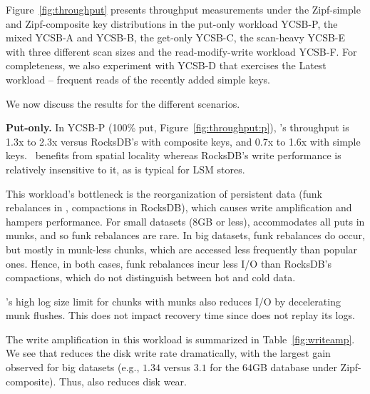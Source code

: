 Figure~\ref{fig:throughput} presents throughput measurements under the Zipf-simple and 
Zipf-composite key distributions in the put-only workload YCSB-P, the mixed YCSB-A and YCSB-B, 
the get-only YCSB-C, the scan-heavy YCSB-E with three different scan sizes
and the read-modify-write workload YCSB-F.
For completeness, we also experiment with YCSB-D that exercises the 
Latest workload -- frequent reads of the recently added simple keys. 

We now discuss the results for the different scenarios.

  
{\bf Put-only.} 
In {YCSB-P} (100\% put, Figure~\ref{fig:throughput:p}), 
\sys's throughput is 1.3x to 2.3x versus RocksDB's with composite keys, 
and 0.7x to 1.6x with simple keys. 
\sys\ benefits from spatial locality whereas RocksDB's write performance 
is relatively insensitive to it, as is typical for LSM stores.

This workload's bottleneck is the reorganization of persistent data  
(funk rebalances in \sys, compactions in RocksDB), which causes 
write amplification and hampers performance. 
For small datasets (8GB or less), \sys\/ accommodates all puts in munks, and so
funk rebalances are rare. In big datasets, funk rebalances do occur, but mostly in munk-less 
chunks, which are accessed less frequently than popular ones. 
Hence, in both cases, funk rebalances incur less I/O than RocksDB's compactions, which do not 
distinguish between hot and cold data. 

\sys\/'s high log size limit for chunks with munks 
also reduces I/O by decelerating munk flushes. This does not impact recovery time since \sys\/ 
does not replay its logs.

The write amplification in this workload is summarized in 
Table~\ref{fig:writeamp}. We see that \sys\/ reduces the disk write rate dramatically, 
with the largest gain observed for big datasets (e.g., $1.34$ versus $3.1$ for the 64GB 
database under Zipf-composite). Thus, \sys\/ also reduces disk wear.  


